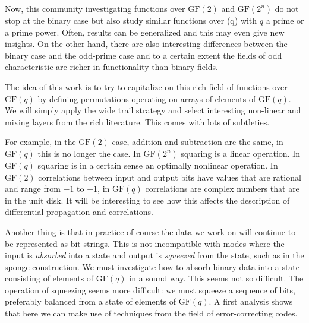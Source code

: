 \documentclass{article}
\newcommand{\gfq}{{\text{GF}(q) }}
\newcommand{\gftwo}{{\text{GF}(2)}}
\newcommand{\gfpar}[2]{{\text{GF}({#1}^{#2})}}
\begin{document}
Now, this community investigating functions over $\gftwo$ and $\gfpar{2}{n}$ do not stop at the binary case but also study similar functions over \gfq  with $q$ a prime or a prime power. Often, results can be generalized and this may even give new insights. On the other hand, there are also interesting differences between the binary case and the odd-prime case and to a certain extent the fields of odd characteristic are richer in functionality than binary fields.

The idea of this work is to try to capitalize on this rich field of functions over $\gfq$ by defining permutations operating on arrays of elements of $\gfq$. We will simply apply the wide trail strategy and select interesting non-linear and mixing layers from the rich literature. This comes with lots of subtleties.

For example, in the $\gftwo$ case, addition and subtraction are the same, in $\gfq$ this is no longer the case. In $\gfpar{2}{n}$ squaring is a linear operation. In $\gfq$ squaring is in a certain sense an optimally nonlinear operation. In $\gftwo$ correlations between input and output bits have values that are rational and range from $-1$ to $+1$, in $\gfq$ correlations are complex numbers that are in the unit disk. It will be interesting to see how this affects the description of differential propagation and correlations.

Another thing is that in practice of course the data we work on will continue to be represented as bit strings. This is not incompatible with modes where the input is \emph{absorbed} into a state and output is \emph{squeezed} from the state, such as in the sponge construction. We must investigate how to absorb binary data into a state consisting of elements of $\gfq$ in a sound way. This seems not so difficult. The operation of squeezing seems more difficult: we must squeeze a sequence of bits, preferably balanced from a state of elements of $\gfq$. A first analysis shows that here we can make use of techniques from the field of error-correcting codes.
\end{document}
